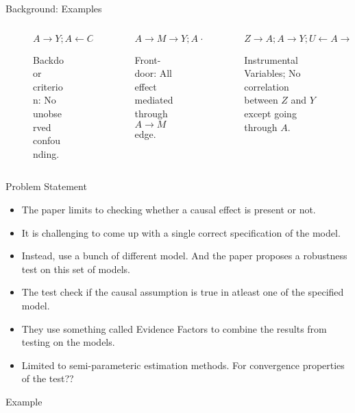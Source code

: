 \documentclass{beamer}
\begin{document}
\begin{frame}{Background: Examples}
	\begin{columns}
		\begin{column}{0.33 \textwidth}
			\center
			\begin{figure}
				$ A \rightarrow Y; A \leftarrow C \rightarrow Y $
				\caption{Backdoor criterion: No unobserved confounding.}
			\end{figure}
		\end{column}
		\begin{column}{0.33 \textwidth}
			\center
			\begin{figure}
				$ A \rightarrow M \rightarrow Y; A \leftarrow U \rightarrow Y  $
				\caption{Front-door: All effect mediated through $ A \rightarrow M $ edge.}
			\end{figure}
		\end{column}
		\begin{column}{0.33 \textwidth}
			\center
			\begin{figure}
				$ Z \rightarrow A; A \rightarrow Y; U \leftarrow A \rightarrow Y $
				\caption{Instrumental Variables; No correlation between $ Z $ and $ Y $ except going through $ A $.}
			\end{figure}
		\end{column}
	\end{columns}
\end{frame}

\begin{frame}{Problem Statement}
	\begin{itemize}
		\item The paper limits to checking whether a causal effect is present or not.
		\item It is challenging to come up with a single correct specification of the model.
		\item Instead, use a bunch of different model. And the paper proposes a robustness test on this set of models.
		\item The test check if the causal assumption is true in atleast one of the specified model.
		\item They use something called Evidence Factors to combine the results from testing on the models.
		\item Limited to semi-parameteric estimation methods. For convergence properties of the test??
	\end{itemize}
\end{frame}

\begin{frame}{Example}
\end{frame}
\end{document}
